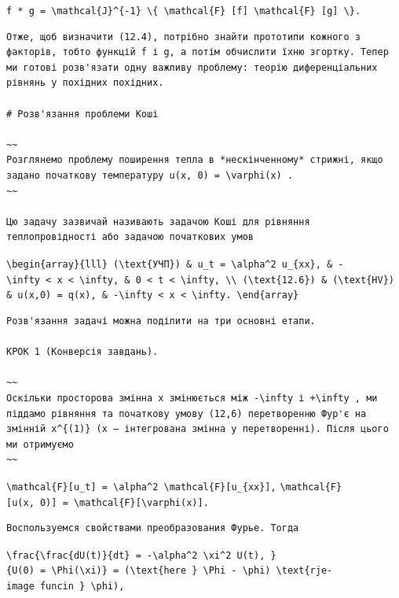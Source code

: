 \documentclass[
  ukrainian,
]{article}
\begin{document}
\texttt{f\ *\ g\ =\ \textbackslash{}mathcal\{J\}\^{}\{-1\}\ \textbackslash{}\{\ \textbackslash{}mathcal\{F\}\ {[}f{]}\ \textbackslash{}mathcal\{F\}\ {[}g{]}\ \textbackslash{}\}.}

\begin{verbatim}
Отже, щоб визначити (12.4), потрібно знайти прототипи кожного з факторів, тобто функцій f і g, а потім обчислити їхню згортку. Тепер ми готові розв'язати одну важливу проблему: теорію диференціальних рівнянь у похідних похідних.

# Розв'язання проблеми Коші

~~
Розглянемо проблему поширення тепла в *нескінченному* стрижні, якщо задано початкову температуру u(x, 0) = \varphi(x) .
~~

Цю задачу зазвичай називають задачою Коші для рівняння теплопровідності або задачою початкових умов
\end{verbatim}

\texttt{\textbackslash{}begin\{array\}\{lll\}\ (\textbackslash{}text\{УЧП\})\ \&\ u\_t\ =\ \textbackslash{}alpha\^{}2\ u\_\{xx\},\ \&\ -\textbackslash{}infty\ \textless{}\ x\ \textless{}\ \textbackslash{}infty,\ \&\ 0\ \textless{}\ t\ \textless{}\ \textbackslash{}infty,\ \textbackslash{}\textbackslash{}\ (\textbackslash{}text\{12.6\})\ \&\ (\textbackslash{}text\{HV\})\ \&\ u(x,0)\ =\ q(x),\ \&\ -\textbackslash{}infty\ \textless{}\ x\ \textless{}\ \textbackslash{}infty.\ \textbackslash{}end\{array\}}

\begin{verbatim}
Розв'язання задачі можна поділити на три основні етапи.

КРОК 1 (Конверсія завдань).

~~
Оскільки просторова змінна x змінюється між -\infty і +\infty , ми піддамо рівняння та початкову умову (12,6) перетворенню Фур'є на змінній x^{(1)} (x — інтегрована змінна у перетворенні). Після цього ми отримуємо
~~
\end{verbatim}

\texttt{\textbackslash{}mathcal\{F\}{[}u\_t{]}\ =\ \textbackslash{}alpha\^{}2\ \textbackslash{}mathcal\{F\}{[}u\_\{xx\}{]},}
\texttt{\textbackslash{}mathcal\{F\}{[}u(x,\ 0){]}\ =\ \textbackslash{}mathcal\{F\}{[}\textbackslash{}varphi(x){]}.}

\begin{verbatim}
Воспользуемся свойствами преобразования Фурье. Тогда
\end{verbatim}

\texttt{\textbackslash{}frac\{\textbackslash{}frac\{dU(t)\}\{dt\}\ =\ -\textbackslash{}alpha\^{}2\ \textbackslash{}xi\^{}2\ U(t),\ \}\{U(0)\ =\ \textbackslash{}Phi(\textbackslash{}xi)\}\ =\ (\textbackslash{}text\{here\ \}\ \textbackslash{}Phi\ -\ \textbackslash{}phi)\ \textbackslash{}text\{rje-image\ funcin\ \}\ \textbackslash{}phi),}
\end{document}
